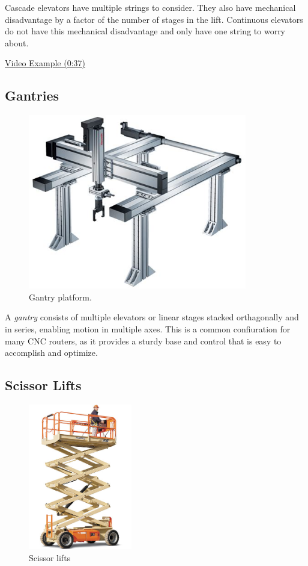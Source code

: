 Cascade elevators have multiple strings to consider. They also have mechanical disadvantage by a factor of the number of stages in the lift. Continuous elevators do not have this mechanical disadvantage and only have one string to worry about.

\href{https://youtu.be/HJVGgaAJefo?t=37}{\color{red}\underline{Video Example (0:37)}}

\subsection{Gantries}
\begin{figure}[H]
	\includegraphics[height=3in]{imgs/gantry.jpeg}
	\caption{Gantry platform.}
\end{figure}
A \textit{gantry} consists of multiple elevators or linear stages stacked orthagonally and in series, enabling motion in multiple axes. This is a common confiuration for many CNC routers, as it provides a sturdy base and control that is easy to accomplish and optimize.

\subsection{Scissor Lifts}
\begin{figure}[H]
	\includegraphics[height=2.5in]{imgs/scissorlift.jpeg}
	\caption{Scissor lifts}
\end{figure}

